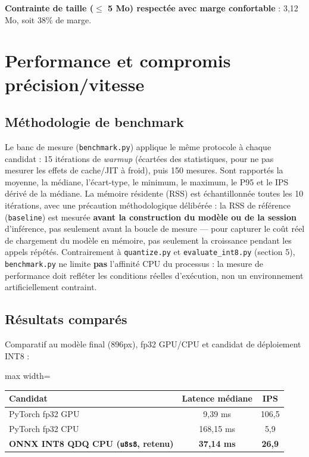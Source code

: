 \documentclass[11pt,a4paper]{article}
\let\Oldsubsection\subsection
\renewcommand{\subsection}{\FloatBarrier\Oldsubsection}
\begin{document}
    \textbf{Contrainte de taille ($\leq$ 5 Mo) respectée avec marge
    confortable} : 3,12 Mo, soit 38\% de marge.
    
    
    \section{Performance et compromis précision/vitesse}
    
    \subsection{Méthodologie de benchmark}
    
    Le banc de mesure (\texttt{benchmark.py}) applique le même
    protocole à chaque candidat : 15 itérations de \emph{warmup} (écartées
    des statistiques, pour ne pas mesurer les effets de cache/JIT à
    froid), puis 150 mesures. Sont rapportés la moyenne, la médiane,
    l'écart-type, le minimum, le maximum, le P95 et le IPS dérivé de la
    médiane. La mémoire résidente (RSS) est échantillonnée toutes les 10
    itérations, avec une précaution méthodologique délibérée : la RSS de
    référence (\texttt{baseline}) est mesurée \textbf{avant la construction
    du modèle ou de la session} d'inférence, pas seulement avant la boucle
    de mesure --- pour capturer le coût réel de chargement du modèle en
    mémoire, pas seulement la croissance pendant les appels répétés.
    Contrairement à \texttt{quantize.py} et \texttt{evaluate\_int8.py}
    (section 5), \texttt{benchmark.py} ne limite \textbf{pas} l'affinité
    CPU du processus : la mesure de performance doit refléter les
    conditions réelles d'exécution, non un environnement artificiellement
    contraint.
    
    \subsection{Résultats comparés}
    
    Comparatif au modèle final (896px), fp32 GPU/CPU et candidat de
    déploiement INT8 :
    
    \begin{table}[!htbp]
    \centering
    \small
    \begin{adjustbox}{max width=\linewidth}
    \begin{tabular}{@{}lcc@{}}
    \toprule
    \textbf{Candidat} & \textbf{Latence médiane} & \textbf{IPS} \\
    \midrule
    PyTorch fp32 GPU & 9,39 ms & 106,5 \\
    PyTorch fp32 CPU & 168,15 ms & 5,9 \\
    \textbf{ONNX INT8 QDQ CPU (\texttt{u8s8}, retenu)} & \textbf{37,14 ms} & \textbf{26,9} \\
    \bottomrule
    \end{tabular}
    \end{adjustbox}
    \end{table}
    
\end{document}
